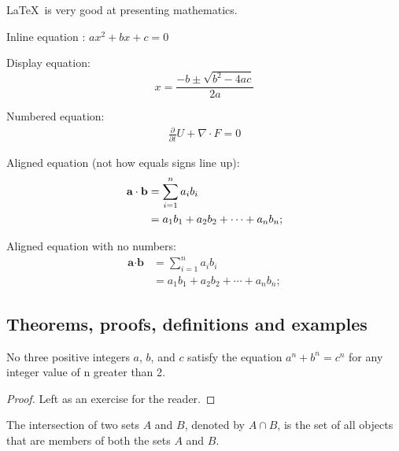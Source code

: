 \LaTeX\ is very good at presenting mathematics.

Inline equation :
$ax^2 + bx + c = 0$ %

Display equation:
$$x = \frac{-b \pm \sqrt{b^2 - 4ac}}{2a}$$ %

Numbered equation:
\begin{align}
	\label{eq:equation label} %
	\frac{\partial}{\partial t} U + \nabla \cdot F = 0
\end{align}

Aligned equation (not how equals signs line up):
\begin{align}
	\notag %
	\label{eq:dot product}
	\textbf{a} \cdot \textbf{b} &= \sum_{i=1}^n a_ib_i \\
	&= a_1b_1 + a_2b_2 + \cdots + a_nb_n; %
\end{align}

Aligned equation with no numbers:
\begin{align*} %
	\label{eq:dot product}
	\textbf{a} \cdot \textbf{b} &= \sum_{i=1}^n a_ib_i \\
	&= a_1b_1 + a_2b_2 + \cdots + a_nb_n;
\end{align*}

\subsection{Theorems, proofs, definitions and examples}

\begin{theorem}
No three positive integers $a$, $b$, and $c$ satisfy the equation $a^n + b^n = c^n$ for any integer value of n greater than 2.
\end{theorem}

\begin{proof}
Left as an exercise for the reader.
\end{proof}

\begin{definition}
The intersection of two sets $A$ and $B$, denoted by $A \cap B$, is the set of all objects that are members of both the sets $A$ and $B$.
\end{definition}

